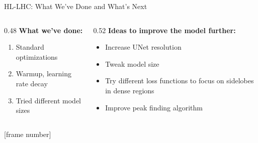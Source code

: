 \documentclass[xcolor=table,aspectratio=169]{beamer}
\newcommand{\backupend}{
    \setcounter{framenumber}{\value{finalframe}}
    \setbeamertemplate{footline}[frame number]
}
\begin{document}
\begin{frame}{HL-LHC: What We've Done and What's Next}
    \begin{columns}[t]
        \begin{column}{0.48\linewidth}
            \textbf{What we've done:}
            \begin{enumerate}
                \setlength\itemsep{0.4em}
                \item Standard optimizations
                \item Warmup, learning rate decay
                \item Tried different model sizes
            \end{enumerate}
        \end{column}
        \begin{column}{0.52\linewidth}
            \textbf{Ideas to improve the model further:}
            \begin{itemize}
                \setlength\itemsep{0.4em}
                \item Increase UNet resolution
                \item Tweak model size
                \item Try different loss functions to focus on sidelobes in dense regions
                \item Improve peak finding algorithm
            \end{itemize}
        \end{column}
    \end{columns}
\end{frame}

\backupend
\end{document}
